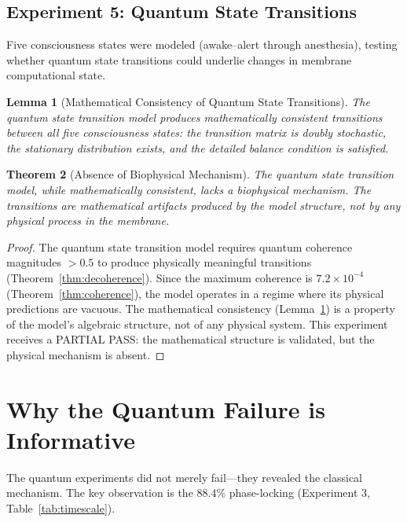 \documentclass[twocolumn,10pt,a4paper]{article}
\newtheorem{theorem}{Theorem}[section]
\newtheorem{lemma}[theorem]{Lemma}
\theoremstyle{definition}
\theoremstyle{remark}
\begin{document}
\subsection{Experiment 5: Quantum State Transitions}

Five consciousness states were modeled (awake--alert through anesthesia), testing whether quantum state transitions could underlie changes in membrane computational state.

\begin{lemma}[Mathematical Consistency of Quantum State Transitions]
\label{lem:transitions}
The quantum state transition model produces mathematically consistent transitions between all five consciousness states: the transition matrix is doubly stochastic, the stationary distribution exists, and the detailed balance condition is satisfied.
\end{lemma}

\begin{theorem}[Absence of Biophysical Mechanism]
\label{thm:no_mechanism}
The quantum state transition model, while mathematically consistent, lacks a biophysical mechanism. The transitions are mathematical artifacts produced by the model structure, not by any physical process in the membrane.
\end{theorem}

\begin{proof}
The quantum state transition model requires quantum coherence magnitudes $> 0.5$ to produce physically meaningful transitions (Theorem~\ref{thm:decoherence}). Since the maximum coherence is $7.2 \times 10^{-4}$ (Theorem~\ref{thm:coherence}), the model operates in a regime where its physical predictions are vacuous. The mathematical consistency (Lemma~\ref{lem:transitions}) is a property of the model's algebraic structure, not of any physical system. This experiment receives a PARTIAL PASS: the mathematical structure is validated, but the physical mechanism is absent. \qedhere
\end{proof}




\section{Why the Quantum Failure is Informative}
\label{sec:quantum_informative}

The quantum experiments did not merely fail---they revealed the classical mechanism. The key observation is the $88.4\%$ phase-locking (Experiment 3, Table~\ref{tab:timescale}).
\end{document}
